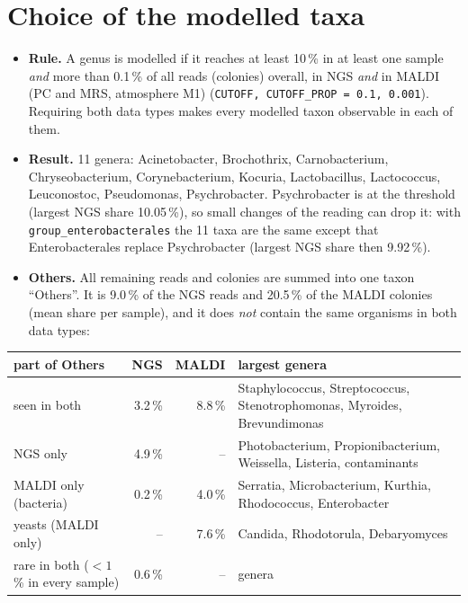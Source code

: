 \documentclass[11pt,a4paper]{article}
\newcommand{\code}[1]{\texttt{#1}}
\begin{document}
\section{Choice of the modelled taxa}

\begin{itemize}
\item \textbf{Rule.} A genus is modelled if it reaches at least 10\,\% in at least one sample \emph{and} more than 0.1\,\% of all reads (colonies) overall, in NGS \emph{and} in MALDI (PC and MRS, atmosphere M1) (\code{CUTOFF, CUTOFF\_PROP = 0.1, 0.001}). Requiring both data types makes every modelled taxon observable in each of them.
\item \textbf{Result.} 11 genera: Acinetobacter, Brochothrix, Carnobacterium, Chryseobacterium, Corynebacterium, Kocuria, Lactobacillus, Lactococcus, Leuconostoc, Pseudomonas, Psychrobacter. Psychrobacter is at the threshold (largest NGS share 10.05\,\%), so small changes of the reading can drop it: with \code{group\_enterobacterales} the 11 taxa are the same except that Enterobacterales replace Psychrobacter (largest NGS share then 9.92\,\%).
\item \textbf{Others.} All remaining reads and colonies are summed into one taxon ``Others''. It is 9.0\,\% of the NGS reads and 20.5\,\% of the MALDI colonies (mean share per sample), and it does \emph{not} contain the same organisms in both data types:
\end{itemize}

\begin{center}
\small
\begin{tabular}{@{}p{3.6cm}rr>{\raggedright\arraybackslash}p{7.2cm}@{}}
\toprule
part of Others & NGS & MALDI & largest genera \\
\midrule
seen in both & 3.2\,\% & 8.8\,\% & Staphylococcus, Streptococcus, Stenotrophomonas, Myroides, Brevundimonas \\
NGS only & 4.9\,\% & -- & Photobacterium, Propionibacterium, Weissella, Listeria, contaminants \\
MALDI only (bacteria) & 0.2\,\% & 4.0\,\% & Serratia, Microbacterium, Kurthia, Rhodococcus, Enterobacter \\
yeasts (MALDI only) & -- & 7.6\,\% & Candida, Rhodotorula, Debaryomyces \\
rare in both ($<1$\,\% in every sample) & 0.6\,\% & -- & 366 genera \\
\bottomrule
\end{tabular}
\end{center}
\end{document}
